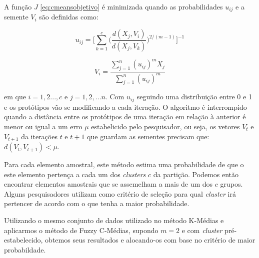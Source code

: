 \documentclass[
  openany]{book}
\begin{document}
A função \(J\) \eqref{eq:cmeansobjetivo} é minimizada quando as probabilidades \(u_{ij}\) e a semente \(V_i\) são definidas como:

\begin{equation}
u_{ij}=\Big[\displaystyle \sum^c_{k=1}\Big(\frac{d(X_j,V_i)}{d(X_j,V_k)}\Big)^{2/(m-1)}\Big]^{-1}
 \label{eq:cmeansprob}
\end{equation}

\begin{equation}
V_{i}=\displaystyle \frac{\sum^n_{j=1}(u_{ij})^m X_j}{\sum^n_{j=1}(u_{ij})^m} 
\label{eq:cmeanssemente}
\end{equation}

em que \(i=1,2...,c\) e \(j=1,2,...n\). Com \(u_{ij}\) seguindo uma distribuição entre 0 e 1 e os protótipos vão se modificando a cada iteração. O algoritmo é interrompido quando a distância entre os protótipos de uma iteração em relação à anterior é menor ou igual a um erro \(\mu\) estabelicido pelo pesquisador, ou seja, os vetores \(V_t\) e \(V_{t+1}\) da iterações \(t\) e \(t+1\) que guardam as sementes precisam que: \(d(V_t,V_{t+1})<\mu\).

Para cada elemento amostral, este método estima uma probabilidade de que o este elemento pertença a cada um dos \emph{clusters} \(c\) da partição. Podemos então encontrar elementos amostrais que se assemelham a mais de um dos \(c\) grupos. Alguns pesquisadores utilizam como critério de seleção para qual \emph{cluster} irá pertencer de acordo com o que tenha a maior probabilidade.

Utilizando o mesmo conjunto de dados utilizado no método K-Médias e aplicarmos o método de Fuzzy C-Médias, supondo \(m=2\) e com \emph{cluster} pré-estabelecido, obtemos seus resultados e alocando-os com base no critério de maior probabildade.
\end{document}
